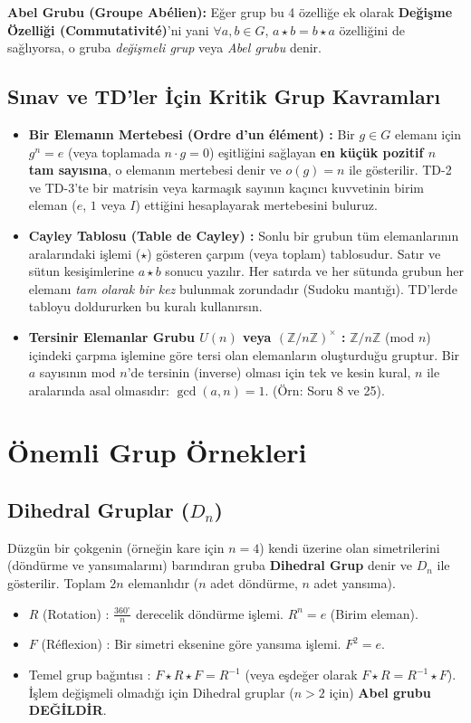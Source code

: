 \documentclass[12pt,a4paper]{report}
\begin{document}
\textbf{Abel Grubu (Groupe Abélien):} Eğer grup bu 4 özelliğe ek olarak \textbf{Değişme Özelliği (Commutativité)}'ni yani $\forall a, b \in G$, $a \star b = b \star a$ özelliğini de sağlıyorsa, o gruba \textit{değişmeli grup} veya \textit{Abel grubu} denir.

\subsection*{Sınav ve TD'ler İçin Kritik Grup Kavramları}
\begin{itemize}
    \item \textbf{Bir Elemanın Mertebesi (Ordre d'un élément) :} Bir $g \in G$ elemanı için $g^n = e$ (veya toplamada $n \cdot g = 0$) eşitliğini sağlayan \textbf{en küçük pozitif $n$ tam sayısına}, o elemanın mertebesi denir ve $o(g)=n$ ile gösterilir. TD-2 ve TD-3'te bir matrisin veya karmaşık sayının kaçıncı kuvvetinin birim eleman ($e$, $1$ veya $I$) ettiğini hesaplayarak mertebesini buluruz.
    \item \textbf{Cayley Tablosu (Table de Cayley) :} Sonlu bir grubun tüm elemanlarının aralarındaki işlemi ($\star$) gösteren çarpım (veya toplam) tablosudur. Satır ve sütun kesişimlerine $a \star b$ sonucu yazılır. Her satırda ve her sütunda grubun her elemanı \textit{tam olarak bir kez} bulunmak zorundadır (Sudoku mantığı). TD'lerde tabloyu doldururken bu kuralı kullanırsın.
    \item \textbf{Tersinir Elemanlar Grubu $U(n)$ veya $(\mathbb{Z}/n\mathbb{Z})^\times$ :} $\mathbb{Z}/n\mathbb{Z}$ (mod $n$) içindeki çarpma işlemine göre tersi olan elemanların oluşturduğu gruptur. Bir $a$ sayısının mod $n$'de tersinin (inverse) olması için tek ve kesin kural, $n$ ile aralarında asal olmasıdır: $\gcd(a, n) = 1$. (Örn: Soru 8 ve 25).
\end{itemize}

\section{Önemli Grup Örnekleri}

\subsection*{Dihedral Gruplar ($D_n$)}
Düzgün bir çokgenin (örneğin kare için $n=4$) kendi üzerine olan simetrilerini (döndürme ve yansımalarını) barındıran gruba \textbf{Dihedral Grup} denir ve $D_n$ ile gösterilir. Toplam $2n$ elemanlıdır ($n$ adet döndürme, $n$ adet yansıma).
\begin{itemize}
    \item $R$ (Rotation) : $\frac{360^\circ}{n}$ derecelik döndürme işlemi. $R^n = e$ (Birim eleman).
    \item $F$ (Réflexion) : Bir simetri eksenine göre yansıma işlemi. $F^2 = e$.
    \item Temel grup bağıntısı : $F \star R \star F = R^{-1}$ (veya eşdeğer olarak $F \star R = R^{-1} \star F$). İşlem değişmeli olmadığı için Dihedral gruplar ($n>2$ için) \textbf{Abel grubu DEĞİLDİR}.
\end{itemize}
\end{document}
